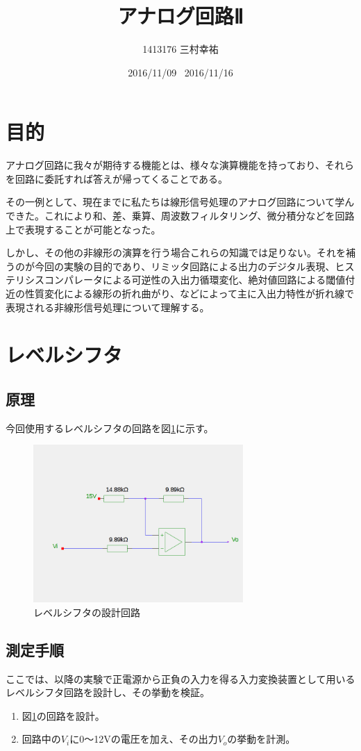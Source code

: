 \documentclass[11pt,a4j]{jsarticle}
\title{アナログ回路Ⅱ}
\author{1413176 三村幸祐}
\date{2016/11/09 \, 2016/11/16}
\begin{document}
  
  
 \section{目的}
 アナログ回路に我々が期待する機能とは、様々な演算機能を持っており、それらを回路に委託すれば答えが帰ってくることである。
 
  その一例として、現在までに私たちは線形信号処理のアナログ回路について学んできた。これにより和、差、乗算、周波数フィルタリング、微分積分などを回路上で表現することが可能となった。
  
  しかし、その他の非線形の演算を行う場合これらの知識では足りない。それを補うのが今回の実験の目的であり、リミッタ回路による出力のデジタル表現、ヒステリシスコンパレータによる可逆性の入出力循環変化、絶対値回路による閾値付近の性質変化による線形の折れ曲がり、などによって主に入出力特性が折れ線で表現される非線形信号処理について理解する。
  
 \section{レベルシフタ}
  \subsection{原理}
   
   今回使用するレベルシフタの回路を図\ref{fig:levelshifter}に示す。
   
   \begin{figure}[htbp]
  \centering
  \includegraphics[width=8cm,clip]{levelshifter.png}
  \caption{レベルシフタの設計回路}
  \label{fig:levelshifter}
 \end{figure}%
   
  \subsection{測定手順}
   ここでは、以降の実験で正電源から正負の入力を得る入力変換装置として用いるレベルシフタ回路を設計し、その挙動を検証。
   \begin{enumerate}
   \item 図\ref{fig:levelshifter}の回路を設計。
   \item 回路中の$V_i$に0～12Vの電圧を加え、その出力$V_o$の挙動を計測。
   \end{enumerate}
   
\end{document}
